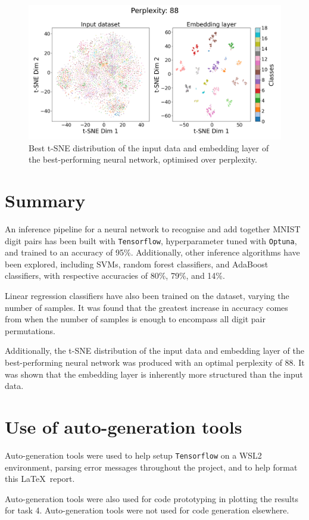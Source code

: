 \documentclass[11pt,a4paper]{article}
\begin{document}
\begin{figure}[htb]
    \centering
    \includegraphics[width=\columnwidth, keepaspectratio]{../best_tsne.png}
    \caption{Best t-SNE distribution of the input data and embedding layer of the best-performing neural network, optimised over perplexity.}\label{fig:best_tsne}
\end{figure}

\section{Summary}
An inference pipeline for a neural network to recognise and add together MNIST digit pairs has been built with \texttt{Tensorflow}, hyperparameter tuned with \texttt{Optuna}, and trained to an accuracy of 95\%. Additionally, other inference algorithms have been explored, including SVMs, random forest classifiers, and AdaBoost classifiers, with respective accuracies of 80\%, 79\%, and 14\%. 

Linear regression classifiers have also been trained on the dataset, varying the number of samples. It was found that the greatest increase in accuracy comes from when the number of samples is enough to encompass all digit pair permutations.

Additionally, the t-SNE distribution of the input data and embedding layer of the best-performing neural network was produced with an optimal perplexity of 88. It was shown that the embedding layer is inherently more structured than the input data.
\clearpage


\appendix
\section{Use of auto-generation tools}
Auto-generation tools were used to help setup \texttt{Tensorflow} on a WSL2 environment, parsing error messages throughout the project, and to help format this \LaTeX\ report.

Auto-generation tools were also used for code prototyping in plotting the results for task 4. Auto-generation tools were not used for code generation elsewhere.
\end{document}
